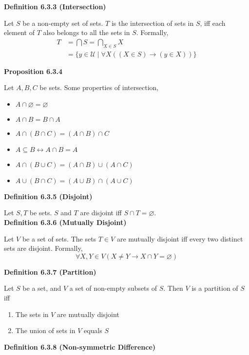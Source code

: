 \documentclass[a4paper]{article}
\newcommand{\subheading}[1]{{\scriptsize\textbf{#1}}}
\begin{document}
\begin{multicols*}{4}
\subheading{Definition 6.3.3 (Intersection)}

Let $S$ be a non-empty set of sets. $T$ is the intersection of sets in $S$, iff
each element of $T$ also belongs to all the sets in $S$. Formally,
\begin{align*}
  T &= \bigcap S = \bigcap_{X \in S} X \\
    &= \{y \in \mathcal{U}\;|\; \forall X ((X \in S) \rightarrow (y \in X)) \}
\end{align*}

\subheading{Proposition 6.3.4}

Let $A, B, C$ be sets. Some properties of intersection,

\begin{itemize}[leftmargin=*] \itemsep -0.3em
  \item $A \cap \varnothing = \varnothing$
  \item $A \cap B = B \cap A$
  \item $A \cap (B \cap C) = (A \cap B) \cap C$
  \item $A \subseteq B \longleftrightarrow A \cap B = A$
  \item $A \cap (B \cup C) = (A \cap B) \cup (A \cap C)$
  \item $A \cup (B \cap C) = (A \cup B) \cap (A \cup C)$
\end{itemize}

\subheading{Definition 6.3.5 (Disjoint)}

Let $S, T$ be sets. $S$ and $T$ are disjoint iff $S \cap T = \varnothing$.\\

\subheading{Definition 6.3.6 (Mutually Disjoint)}

Let $V$ be a set of sets. The sets $T \in V$ are mutually disjoint iff every two
distinct sets are disjoint. Formally,
$$\forall X, Y \in V (X \neq Y \rightarrow X \cap Y = \varnothing)$$

\subheading{Definition 6.3.7 (Partition)}

Let $S$ be a set, and $V$ a set of non-empty subsets of $S$. Then $V$ is a
partition of $S$ iff
\begin{enumerate} \itemsep -0.5em
  \item The sets in $V$ are mutually disjoint
  \item The union of sets in $V$ equals $S$
\end{enumerate}

\subheading{Definition 6.3.8 (Non-symmetric Difference)}


\end{multicols*}
\end{document}
